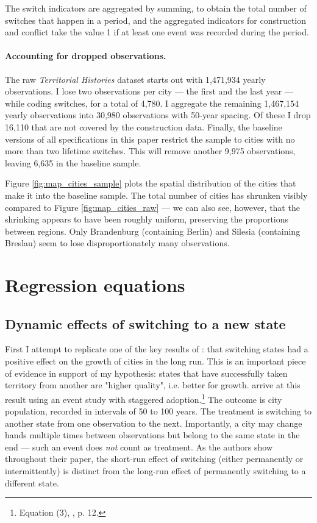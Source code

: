 \documentclass[11pt, a4paper]{article}
\begin{document}
The switch indicators are aggregated by summing, to obtain the total number of switches that happen in a period, and the aggregated indicators for construction and conflict take the value 1 if at least one event was recorded during the period. 

\paragraph{Accounting for dropped observations.}

The raw \textit{Territorial Histories} dataset starts out with 1,471,934 yearly observations. I lose two observations per city --- the first and the last year --- while coding switches, for a total of 4,780. I aggregate the remaining 1,467,154 yearly observations into 30,980 observations with 50-year spacing. Of these I drop 16,110 that are not covered by the construction data. Finally, the baseline versions of all specifications in this paper restrict the sample to cities with no more than two lifetime switches. This will remove another 9,975 observations, leaving 6,635 in the baseline sample.

Figure \ref{fig:map_cities_sample} plots the spatial distribution of the cities that make it into the baseline sample. The total number of cities has shrunken visibly compared to Figure \ref{fig:map_cities_raw} --- we can also see, however, that the shrinking appears to have been roughly uniform, preserving the proportions between regions. Only Brandenburg (containing Berlin) and Silesia (containing Breslau) seem to lose disproportionately many observations.


\section{Regression equations} \label{sec:empirics}

\subsection{Dynamic effects of switching to a new state}

First I attempt to replicate one of the key results of \cite{schoenholzer2022}: that switching states had a positive effect on the growth of cities in the long run. This is an important piece of evidence in support of my hypothesis: states that have successfully taken territory from another are "higher quality", i.e. better for growth. \cite{schoenholzer2022} arrive at this result using an event study with staggered adoption.\footnote
{
    Equation (3), \citealp{schoenholzer2022}, p. 12.
}
The outcome is city population, recorded in intervals of 50 to 100 years. The treatment is switching to another state from one observation to the next. Importantly, a city may change hands multiple times between observations but belong to the same state in the end --- such an event does \textit{not} count as treatment. As the authors show throughout their paper, the short-run effect of switching (either permanently or intermittently) is distinct from the long-run effect of permanently switching to a different state.
\end{document}
